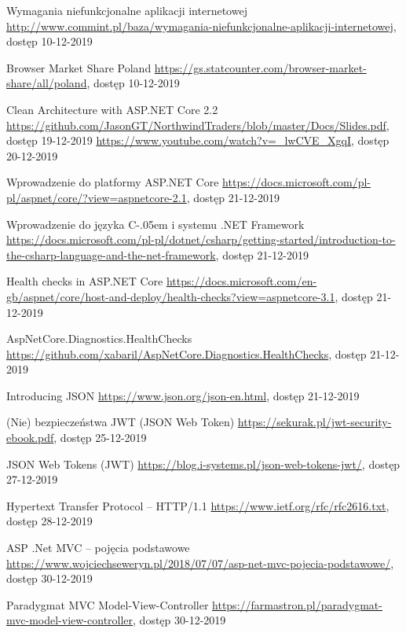 \documentclass[12pt]{article}
\newcommand{\Csharp}{%
  {\settoheight{\dimen0}{C}C\kern-.05em \resizebox{!}{\dimen0}{\raisebox{\depth}{\# }}}}
\numberwithin{figure}{section}
\begin{document}
\begin{sloppypar}
\begin{thebibliography}{99}
    Wymagania niefunkcjonalne aplikacji internetowej
    \url{http://www.commint.pl/baza/wymagania-niefunkcjonalne-aplikacji-internetowej}, dostęp 10-12-2019
    
    Browser Market Share Poland
    \url{https://gs.statcounter.com/browser-market-share/all/poland}, dostęp 10-12-2019
    
    Clean Architecture with ASP.NET Core 2.2
    \url{https://github.com/JasonGT/NorthwindTraders/blob/master/Docs/Slides.pdf}, dostęp 19-12-2019
    \url{https://www.youtube.com/watch?v=_lwCVE_XgqI}, dostęp 20-12-2019
    
    Wprowadzenie do platformy ASP.NET Core
    \url{https://docs.microsoft.com/pl-pl/aspnet/core/?view=aspnetcore-2.1}, dostęp 21-12-2019
    
    Wprowadzenie do języka \Csharp i systemu .NET Framework
    \url{https://docs.microsoft.com/pl-pl/dotnet/csharp/getting-started/introduction-to-the-csharp-language-and-the-net-framework}, dostęp 21-12-2019
    
    Health checks in ASP.NET Core
    \url{https://docs.microsoft.com/en-gb/aspnet/core/host-and-deploy/health-checks?view=aspnetcore-3.1}, dostęp 21-12-2019
    
    AspNetCore.Diagnostics.HealthChecks
    \url{https://github.com/xabaril/AspNetCore.Diagnostics.HealthChecks}, dostęp 21-12-2019
    
    Introducing JSON
    \url{https://www.json.org/json-en.html}, dostęp 21-12-2019
    
    (Nie) bezpieczeństwa JWT (JSON Web Token)
    \url{https://sekurak.pl/jwt-security-ebook.pdf}, dostęp 25-12-2019
    
    JSON Web Tokens (JWT)
    \url{https://blog.i-systems.pl/json-web-tokens-jwt/}, dostęp 27-12-2019
    
    Hypertext Transfer Protocol -- HTTP/1.1
    \url{https://www.ietf.org/rfc/rfc2616.txt}, dostęp 28-12-2019
    
    ASP .Net MVC – pojęcia podstawowe
    \url{https://www.wojciechseweryn.pl/2018/07/07/asp-net-mvc-pojecia-podstawowe/}, dostęp 30-12-2019
    
    Paradygmat MVC Model-View-Controller
    \url{https://farmastron.pl/paradygmat-mvc-model-view-controller}, dostęp 30-12-2019


    \end{thebibliography}
\end{sloppypar}
\end{document}
